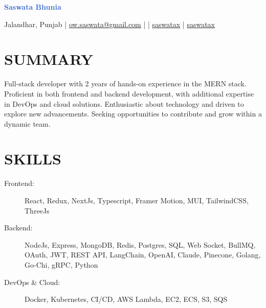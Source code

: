\documentclass[]{resume}
\begin{document}
\textrm{\Huge\textcolor{highlight}{\textbf{Saswata Bhunia}}}
\vspace{.4em}

Jalandhar, Punjab | \href{mailto:ow.saswata@gmail.com}{\faEnvelope \space ow.saswata@gmail.com} | \faPhone {} | \href{https://www.linkedin.com/in/saswatax}{\faLinkedin \space saswatax} | \href{https://github.com/saswatax}{\faGithub \space saswatax}
\vspace{.4em}

\section{SUMMARY}
Full-stack developer with 2 years of hands-on experience in the MERN stack. Proficient in both frontend and backend development, with additional expertise in DevOps and cloud solutions. Enthusiastic about technology and driven to explore new advancements. Seeking opportunities to contribute and grow within a dynamic team.

\section{SKILLS}
\begin{description}
  \item[Frontend:] React, Redux, NextJs, Typescript, Framer Motion, MUI, TailwindCSS, ThreeJs 
  \item[Backend:] NodeJs, Express, MongoDB, Redis, Postgres, SQL, Web Socket, BullMQ, OAuth, JWT, REST API, LangChain, OpenAI, Claude, Pinecone, Golang, Go-Chi, gRPC, Python
  \item[DevOps \& Cloud:] Docker, Kubernetes, CI/CD, AWS Lambda, EC2, ECS, S3, SQS
\end{description}
\end{document}
